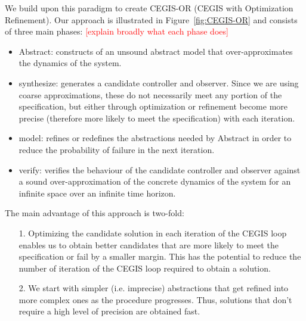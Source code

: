 \documentclass[sigconf]{llncs}
\renewcommand{\note}[1]{\textcolor{red}{[#1]}}
\begin{document}
We build upon this paradigm to create CEGIS-OR (CEGIS with Optimization
Refinement).
Our approach is illustrated in Figure~\ref{fig:CEGIS-OR} and consists of three main
phases:
  \note{explain broadly what each phase does}
\begin{itemize}
\item {\sc Abstract}: constructs of an unsound abstract model that over-approximates
the dynamics of the system.
\item {\sc synthesize}: generates a candidate controller and observer.  Since
  we are using coarse approximations, these do not necessarily meet any portion
  of the specification, but either through optimization or refinement become
  more precise (therefore more likely to meet the specification) with each iteration.
\item {\sc model}: refines or redefines the abstractions needed by {\sc Abstract}
  in order to reduce the probability of failure in the next iteration.
\item {\sc verify}: verifies the behaviour of the candidate controller and observer
  against a sound over-approximation of the concrete dynamics of the system for an infinite space over an infinite time horizon.
\end{itemize}


The main advantage of this approach is two-fold:
\begin{itemize}
\item[1.] Optimizing the candidate solution in each iteration of the CEGIS loop
  enables us to obtain better candidates that are more likely to meet the
  specification or fail by a smaller margin.  This has the potential to reduce
  the number of iteration of the CEGIS loop required to obtain a solution.
\item[2.] We start with simpler (i.e. imprecise) abstractions that get
  refined into more complex ones as the procedure progresses. Thus, solutions
  that don't require a high level of precision are obtained fast. 
\end{itemize}
  
\end{document}

